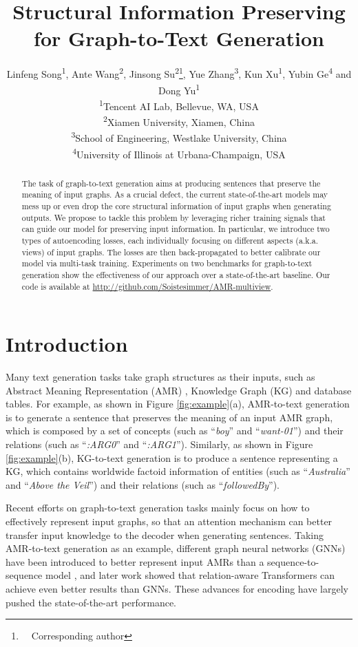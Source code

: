 \documentclass[11pt,a4paper]{article}
\title{Structural Information Preserving for Graph-to-Text Generation}
\author{Linfeng Song\textsuperscript{1}, Ante Wang\textsuperscript{2}, Jinsong Su\textsuperscript{2}\thanks{~~Corresponding author}, Yue Zhang\textsuperscript{3}, Kun Xu\textsuperscript{1}, Yubin Ge\textsuperscript{4} and Dong Yu\textsuperscript{1} \\
  \textsuperscript{1}Tencent AI Lab, Bellevue, WA, USA \\
  \textsuperscript{2}Xiamen University, Xiamen, China \\
  \textsuperscript{3}School of Engineering, Westlake University, China \\
  \textsuperscript{4}University of Illinois at Urbana-Champaign, USA \\}
\date{}
\begin{document}
\maketitle
\begin{abstract}
  The task of graph-to-text generation aims at producing sentences that preserve the meaning of input graphs.
  As a crucial defect, the current state-of-the-art models may mess up or even drop the core structural information of input graphs when generating outputs.
  We propose to tackle this problem by leveraging richer training signals that can guide our model for preserving input information.
  In particular, we introduce two types of autoencoding losses, each individually focusing on different aspects (a.k.a. views) of input graphs.
  The losses are then back-propagated to better calibrate our model via multi-task training.
  Experiments on two benchmarks for graph-to-text generation show the effectiveness of our approach over a state-of-the-art baseline.
  Our code is available at \url{http://github.com/Soistesimmer/AMR-multiview}.
\end{abstract}


\section{Introduction}


Many text generation tasks take graph structures as their inputs, such as Abstract Meaning Representation (AMR) \citep{banarescu2013abstract}, Knowledge Graph (KG) and database tables.
For example, as shown in Figure \ref{fig:example}(a), AMR-to-text generation is to generate a sentence that preserves the meaning of an input AMR graph, which is composed by a set of concepts (such as ``\emph{boy}'' and ``\emph{want-01}'') and their relations (such as ``\emph{:ARG0}'' and ``\emph{:ARG1}'').
Similarly, as shown in Figure \ref{fig:example}(b), KG-to-text generation is to produce a sentence representing a KG, which contains worldwide factoid information of entities (such as ``\emph{Australia}'' and ``\emph{Above the Veil}'') and their relations (such as ``\emph{followedBy}'').


Recent efforts on graph-to-text generation tasks mainly focus on how to effectively represent input graphs, so that an attention mechanism can better transfer input knowledge to the decoder when generating sentences.
Taking AMR-to-text generation as an example, different graph neural networks (GNNs) \citep{beck2018graph,song2018graph,guo2019densely,ribeiro2019enhancing} have been introduced to better represent input AMRs than a sequence-to-sequence model \citep{konstas2017neural}, and later work \citep{zhu2019modeling,cai2019graph,wang2020amr} showed that relation-aware Transformers can achieve even better results than GNNs.
These advances for encoding have largely pushed the state-of-the-art performance.
\end{document}
